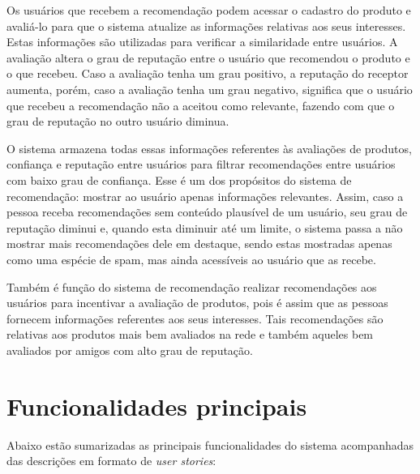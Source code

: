 
 Os usuários que recebem a recomendação podem acessar o cadastro do produto e avaliá-lo para que o sistema atualize as informações relativas aos seus interesses. Estas informações são utilizadas para verificar a similaridade entre usuários. A avaliação altera o grau de reputação entre o usuário que recomendou o produto e o que recebeu. Caso a avaliação tenha um grau positivo, a reputação do receptor aumenta, porém, caso a avaliação tenha um grau negativo, significa que o usuário que recebeu a recomendação não a aceitou como relevante, fazendo com que o grau de reputação no outro usuário diminua.

 O sistema armazena todas essas informações referentes às avaliações de produtos, confiança e reputação entre usuários para filtrar recomendações entre usuários com baixo grau de confiança. Esse é um dos propósitos do sistema de recomendação: mostrar ao usuário apenas informações relevantes. Assim, caso a pessoa receba recomendações sem conteúdo plausível de um usuário, seu grau de reputação diminui e, quando esta diminuir até um limite, o sistema passa a não mostrar mais recomendações dele em destaque, sendo estas mostradas apenas como uma espécie de spam, mas ainda acessíveis ao usuário que as recebe.

 Também é função do sistema de recomendação realizar recomendações aos usuários para incentivar a avaliação de produtos, pois é assim que as pessoas fornecem informações referentes aos seus interesses. Tais recomendações são relativas aos produtos mais bem avaliados na rede e também aqueles bem avaliados por amigos com alto grau de reputação.

\section{Funcionalidades principais} %
\label{sec:funcionalidades_principais}

Abaixo estão sumarizadas as principais funcionalidades do sistema acompanhadas das descrições em formato de \textit{user stories}:

